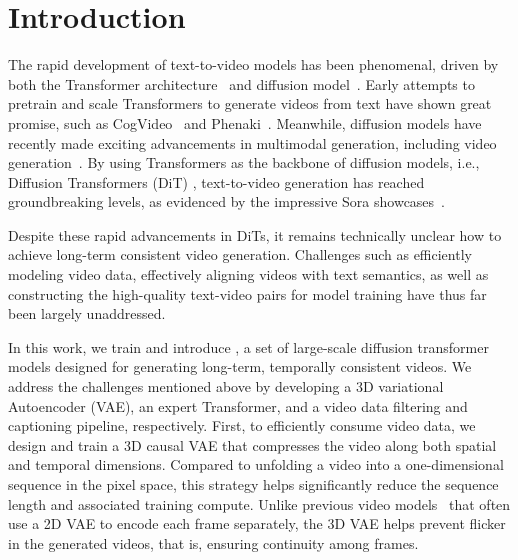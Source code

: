 \section{Introduction}

The rapid development of text-to-video models has been phenomenal, driven by both the Transformer architecture~\citep{vaswani2017attention} and diffusion model~\citep{ho2020denoising}. 
Early attempts to pretrain and scale Transformers to generate videos from text have shown great promise, such as CogVideo~\citep{hong2022cogvideo} and Phenaki~\citep{villegas2022phenaki}. 
Meanwhile, diffusion models have recently made exciting advancements in multimodal generation, including video generation~\citep{singer2022make, ho2022imagen}. 
By using Transformers as the backbone of diffusion models, i.e., Diffusion Transformers (DiT) \citep{peebles2023scalable}, text-to-video generation has reached groundbreaking levels, as evidenced by the impressive Sora showcases~\citep{sora}.  


Despite these rapid advancements in DiTs, it remains technically unclear how to achieve long-term consistent video generation. 
Challenges such as efficiently modeling video data, effectively aligning videos with text semantics, as well as constructing the high-quality text-video pairs for model training have thus far been largely unaddressed. 


In this work, we train and introduce \model, a set of large-scale diffusion transformer models designed for generating long-term, temporally consistent videos. 
We address the challenges mentioned above by developing a 3D variational Autoencoder (VAE), an expert Transformer, and a video data filtering and captioning pipeline, respectively. 
First, to efficiently consume video data, we design and train a 3D causal VAE that compresses the video along both spatial and temporal dimensions. 
Compared to unfolding a video into a one-dimensional sequence in the pixel space, this strategy helps significantly reduce the sequence length and associated training compute. 
Unlike previous video models~\citep{blattmann2023stable} that often use a 2D VAE to encode each frame separately, the 3D VAE helps prevent flicker in the generated videos, that is, ensuring continuity among frames. 


